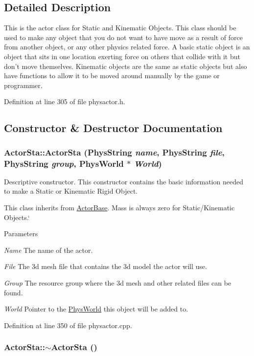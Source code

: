 \subsection{Detailed Description}
This is the actor class for Static and Kinematic Objects. This class should be used to make any object that you do not want to have move as a result of force from another object, or any other physics related force. A basic static object is an object that sits in one location exerting force on others that collide with it but don't move themselves. Kinematic objects are the same as static objects but also have functions to allow it to be moved around manually by the game or programmer. 

Definition at line 305 of file physactor.h.

\subsection{Constructor \& Destructor Documentation}
\hypertarget{classActorSta_a00185fe588416c236f491b65f16dd145}{
\subsubsection[{ActorSta}]{\setlength{\rightskip}{0pt plus 5cm}ActorSta::ActorSta (PhysString {\em name}, \/  PhysString {\em file}, \/  PhysString {\em group}, \/  {\bf PhysWorld} $\ast$ {\em World})}}
\label{d3/daf/classActorSta_a00185fe588416c236f491b65f16dd145}


Descriptive constructor. This constructor contains the basic information needed to make a Static or Kinematic Rigid Object. \par
 This class inherits from \hyperlink{classActorBase}{ActorBase}. Mass is always zero for Static/Kinematic Objects.` 
\begin{DoxyParams}{Parameters}
\item[{\em Name}]The name of the actor. \item[{\em File}]The 3d mesh file that contains the 3d model the actor will use. \item[{\em Group}]The resource group where the 3d mesh and other related files can be found. \item[{\em World}]Pointer to the \hyperlink{classPhysWorld}{PhysWorld} this object will be added to. \end{DoxyParams}


Definition at line 350 of file physactor.cpp.\hypertarget{classActorSta_a5da54cd102413f920df2dae3555fead2}{
\subsubsection[{$\sim$ActorSta}]{\setlength{\rightskip}{0pt plus 5cm}ActorSta::$\sim$ActorSta ()}}
\label{d3/daf/classActorSta_a5da54cd102413f920df2dae3555fead2}


